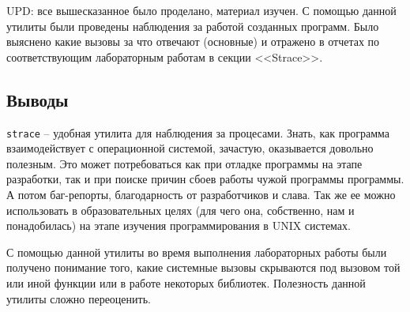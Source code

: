 \documentclass[12pt]{article}
\begin{document}
UPD: все вышесказанное было проделано, материал изучен. С помощью данной утилиты были проведены наблюдения за работой созданных программ. Было выяснено какие вызовы за что отвечают (основные) и отражено в отчетах по соответствующим лабораторным работам в секции <<Strace>>.

\subsection*{Выводы}

\verb|strace| -- удобная утилита для наблюдения за процесами.
Знать, как программа взаимодействует с операционной системой, зачастую, оказывается довольно полезным. Это может потребоваться как при отладке программы на этапе разработки, так и при поиске причин сбоев работы чужой программы программы. А потом баг-репорты, благодарность от разработчиков и слава. Так же ее можно использовать в образовательных целях (для чего она, собственно, нам и понадобилась) на этапе изучения программирования в UNIX системах.

С помощью данной утилиты во время выполнения лабораторных работы были получено понимание того, какие системные вызовы скрываются под вызовом той или иной функции или в работе некоторых библиотек. Полезность данной утилиты сложно переоценить.
\end{document}
